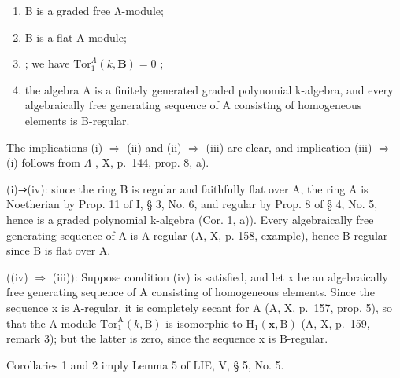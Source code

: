 \begin{enumerate}
\def\labelenumi{(\roman{enumi})}
\item
  B is a graded free Λ-module;
\item
  B is a flat A-module;
\item
  ; we have \(\mathrm{Tor}_1^\Lambda (k,\mathbf{B}) = 0\) ;
\item
  the algebra A is a finitely generated graded polynomial k-algebra, and every algebraically free generating sequence of A consisting of homogeneous elements is B-regular.
\end{enumerate}

The implications (i) \(\Rightarrow\) (ii) and (ii) \(\Rightarrow\) (iii) are clear, and implication (iii) \(\Rightarrow\) (i) follows from \(\Lambda\) , X, p.~144, prop. 8, a).

(i)⇒(iv): since the ring B is regular and faithfully flat over A, the ring A is Noetherian by Prop. 11 of I, § 3, No. 6, and regular by Prop. 8 of § 4, No. 5, hence is a graded polynomial k-algebra (Cor. 1, a)). Every algebraically free generating sequence of A is A-regular (A, X, p. 158, example), hence B-regular since B is flat over A.

((iv) \(\Rightarrow\) (iii)): Suppose condition (iv) is satisfied, and let x be an algebraically free generating sequence of A consisting of homogeneous elements. Since the sequence x is A-regular, it is completely secant for A (A, X, p.~157, prop. 5), so that the A-module \(\mathrm{Tor}_{1}^{\mathrm{A}}(k,\mathrm{B})\) is isomorphic to \(\mathrm{H}_{1}(\mathbf{x},\mathrm{B})\) (A, X, p.~159, remark 3); but the latter is zero, since the sequence x is B-regular.

Corollaries 1 and 2 imply Lemma 5 of LIE, V, § 5, No. 5.

